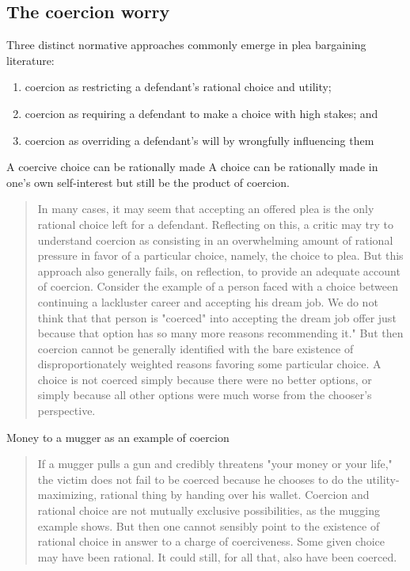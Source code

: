 \subsection{The coercion worry}

Three distinct normative approaches commonly emerge in plea bargaining literature:

\begin{enumerate}
    \item coercion as restricting a defendant's rational choice and utility;
    \item coercion as requiring a defendant to make a choice with high stakes; and
    \item coercion as overriding a defendant's will by wrongfully influencing them
\end{enumerate}

A coercive choice can be rationally made
A choice can be rationally made in one's own self-interest but still be the product of coercion.

\begin{quote}
    In many cases, it may seem that accepting an offered plea is the only rational choice left for a defendant. Reflecting on this, a critic may try to understand coercion as consisting in an overwhelming amount of rational pressure in favor of a particular choice, namely, the choice to plea. But this approach also generally fails, on reflection, to provide an adequate account of coercion. Consider the example of a person faced with a choice between continuing a lackluster career and accepting his dream job. We do not think that that person is "coerced" into accepting the dream job offer just because that option has so many more reasons recommending it." But then coercion cannot be generally identified with the bare existence of disproportionately weighted reasons favoring some particular choice. A choice is not coerced simply because there were no better options, or simply because all other options were much worse from the chooser's perspective.
\end{quote}

Money to a mugger as an example of coercion

\begin{quote}
    If a mugger pulls a gun and credibly threatens "your money or your life," the victim does not fail to be coerced because he chooses to do the utility-maximizing, rational thing by handing over his wallet. Coercion and rational choice are not mutually exclusive possibilities, as the mugging example shows. But then one cannot sensibly point to the existence of rational choice in answer to a charge of coerciveness. Some given choice may have been rational. It could still, for all that, also have been coerced.
\end{quote}

